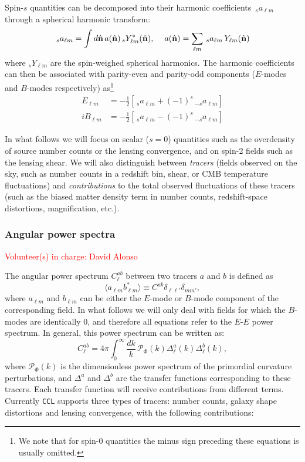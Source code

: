\documentclass[\docopts]{\docclass}
\newcommand{\nv}{\hat{\bf n}}
\newcommand{\vol}[1]{\textcolor{red}{Volunteer(s) in charge: #1}}
\newcommand{\ccl}{{\tt CCL}\xspace}
\begin{document}
Spin-$s$ quantities can be decomposed into their harmonic coefficients $\,_sa_{\ell m}$ through a spherical harmonic transform:
\begin{equation}\nonumber
  \,_sa_{\ell m}=\int d\nv\,a(\nv)\,_sY^*_{\ell m}(\nv),\hspace{12pt}
  a(\nv)=\sum_{\ell m}\,_sa_{\ell m}\,Y_{\ell m}(\nv)
\end{equation}
where $_sY_{\ell m}$ are the spin-weighed spherical harmonics. The harmonic coefficients can then be associated with parity-even and parity-odd components ($E$-modes and $B$-modes respectively) as\footnote{We note that for spin-$0$ quantities the minus sign preceding these equations is usually omitted.}
\begin{align}\nonumber
   E_{\ell m}&=-\frac{1}{2}\left[\,_{s}a_{\ell m}+(-1)^s\,_{-s}a_{\ell m}\right]\\\nonumber
  iB_{\ell m}&=-\frac{1}{2}\left[\,_{s}a_{\ell m}-(-1)^s\,_{-s}a_{\ell m}\right]
\end{align}

In what follows we will focus on scalar ($s=0$) quantities such as the overdensity of source number counts or the lensing convergence, and on spin-2 fields such as the lensing shear. We will also distinguish between {\sl tracers} (fields observed on the sky, such as number counts in a redshift bin, shear, or CMB temperature fluctuations) and {\sl contributions} to the total observed fluctuations of these tracers (such as the biased matter density term in number counts, redshift-space distortions, magnification, etc.).

\subsubsection{Angular power spectra}\label{sssec:2pt.pspec}
\vol{David Alonso}

The angular power spectrum $C^{ab}_\ell$ between two tracers $a$ and $b$ is defined as
\begin{equation}
  \langle a_{\ell m}b^*_{\ell m}\rangle\equiv C^{ab}\delta_{\ell\ell'}\delta_{mm'},
\end{equation}
where $a_{\ell m}$ and $b_{\ell m}$ can be either the $E$-mode or $B$-mode component of the corresponding field. In what follows we will only deal with fields for which the $B$-modes are identically $0$, and therefore all equations refer to the $E$-$E$ power spectrum. In general, this power spectrum can be written as:
\begin{equation}
  C^{ab}_\ell=4\pi\int_0^\infty \frac{dk}{k}\,\mathcal{P}_\Phi(k)\Delta^a_\ell(k)\Delta^b_\ell(k),
  \label{eq:cls}
\end{equation}
where $\mathcal{P}_\Phi(k)$ is the dimensionless power spectrum of the primordial curvature perturbations, and $\Delta^a$ and $\Delta^b$ are the transfer functions corresponding to these tracers. Each transfer function will receive contributions from different terms. Currently \ccl supports three types of tracers: number counts, galaxy shape distortions and lensing convergence, with the following contributions:
\end{document}
